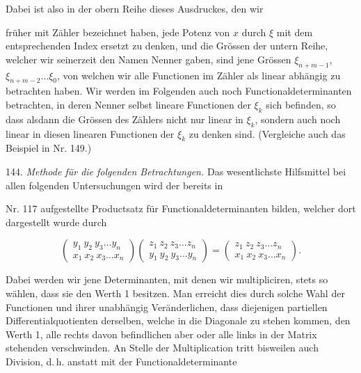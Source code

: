 Dabei ist also in der obern Reihe dieses Ausdruckes, den wir


fr\"uher mit Z\"ahler bezeichnet haben, jede Potenz von $x$ durch $\xi$ mit dem
entsprechenden Index ersetzt zu denken, und die Gr\"ossen der untern Reihe, welcher wir
seinerzeit den Namen Nenner gaben, sind jene Gr\"ossen $\xi_{n+m-1}$, $\xi_{n+m-2}\ldots
\xi_0$, von welchen wir alle Functionen im Z\"ahler als linear abh\"angig zu betrachten
haben. Wir werden im Folgenden auch noch Functionaldeterminanten betrachten, in deren Nenner
selbst lineare Functionen der $\xi_k$ sich befinden, so dass alsdann die Gr\"ossen des
Z\"ahlers nicht nur linear in $\xi_k$, sondern auch noch linear in diesen linearen
Functionen der $\xi_k$ zu denken sind. (Vergleiche auch das Beispiel in Nr. 149.)

144. \textit{Methode f\"ur die folgenden Betrachtungen.} Das wesentlichste Hilfsmittel bei
allen folgenden Untersuchungen wird der bereits in

Nr. 117 aufgestellte Productsatz f\"ur Functionaldeterminanten bilden, welcher dort
dargestellt wurde durch

\[
\left(
\begin{array}{cc}
y_1\ y_2\ y_3 \ldots y_n \\
x_1\ x_2\ x_3 \ldots x_n
\end{array}
\right)
\left(
\begin{array}{cc}
z_1\ z_2\ z_3 \ldots z_n \\
y_1\ y_2\ y_3 \ldots y_n
\end{array}
\right)
=
\left(
\begin{array}{cc}
z_1\ z_2\ z_3 \ldots z_n \\
x_1\ x_2\ x_3 \ldots x_n
\end{array}
\right).
\]

Dabei werden wir jene Determinanten, mit denen wir multipliciren, stets so w\"ahlen, dass
sie den Werth 1 besitzen. Man erreicht dies durch solche Wahl der Functionen und ihrer
unabh\"angig Ver\"anderlichen, dass diejenigen partiellen Differentialquotienten derselben,
welche in die Diagonale zu stehen kommen, den Werth 1, alle rechts davon befindlichen aber
oder alle links in der Matrix stehenden verschwinden. An Stelle der Multiplication tritt
bisweilen auch Division, d.\,h. anstatt mit der Functionaldeterminante


